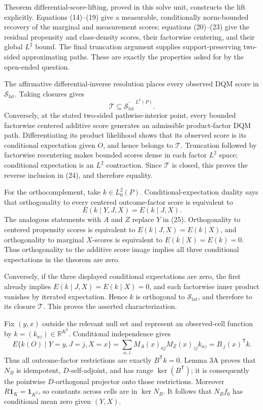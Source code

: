 Theorem \(\mathrm{differential\text{-}score\text{-}lifting}\), proved in this solve unit, constructs the lift explicitly.  Equations (14)--(19) give a measurable, conditionally norm-bounded recovery of the marginal and measurement scores; equations (20)--(23) give the residual propensity and class-density scores, their factorwise centering, and their global \(L^2\) bound.  The final truncation argument supplies support-preserving two-sided approximating paths.  These are exactly the properties asked for by the open-ended question.

The affirmative differential-inverse resolution places every observed DQM score in \(\mathcal S_{\mathrm{lat}}\).  Taking closures gives
\[
\mathcal T\subseteq\overline{\mathcal S_{\mathrm{lat}}}^{\,L^2(P)}. \tag{24}
\]
Conversely, at the stated two-sided pathwise-interior point, every bounded factorwise centered additive score generates an admissible product-factor DQM path.  Differentiating its product likelihood shows that its observed score is its conditional expectation given \(O\), and hence belongs to \(\mathcal T\).  Truncation followed by factorwise recentering makes bounded scores dense in each factor \(L^2\) space; conditional expectation is an \(L^2\) contraction.  Since \(\mathcal T\) is closed, this proves the reverse inclusion in (24), and therefore equality.

For the orthocomplement, take \(k\in L^2_0(P)\).  Conditional-expectation duality says that orthogonality to every centered outcome-factor score is equivalent to
\[
E(k\mid Y,J,X)=E(k\mid J,X). \tag{25}
\]
The analogous statements with \(A\) and \(Z\) replace \(Y\) in (25).  Orthogonality to centered propensity scores is equivalent to \(E(k\mid J,X)=E(k\mid X)\), and orthogonality to marginal \(X\)-scores is equivalent to \(E(k\mid X)=E(k)=0\).  Thus orthogonality to the additive score image implies all three conditional expectations in the theorem are zero.

Conversely, if the three displayed conditional expectations are zero, the first already implies \(E(k\mid J,X)=E(k\mid X)=0\), and each factorwise inner product vanishes by iterated expectation.  Hence \(k\) is orthogonal to \(\mathcal S_{\mathrm{lat}}\), and therefore to its closure \(\mathcal T\).  This proves the asserted characterization.

Fix \((y,x)\) outside the relevant null set and represent an observed-cell function by \(k=(k_{az})\in\mathbb R^{K^2}\).  Conditional independence gives
\[
E\{k(O)\mid Y=y,J=j,X=x\}
=\sum_{a,z}M_A(x)_{aj}M_Z(x)_{zj}k_{az}=B_{\cdot j}(x)^{\mathsf T}k. \tag{26}
\]
Thus all outcome-factor restrictions are exactly \(B^{\mathsf T}k=0\).  Lemma 3A proves that \(N_B\) is idempotent, \(D\)-self-adjoint, and has range \(\ker(B^{\mathsf T})\); it is consequently the pointwise \(D\)-orthogonal projector onto those restrictions.  Moreover \(R\mathbf 1_K=\mathbf 1_{K^2}\), so constants across cells are in \(\ker N_B\).  It follows that \(N_Bf_0\) has conditional mean zero given \((Y,X)\).

